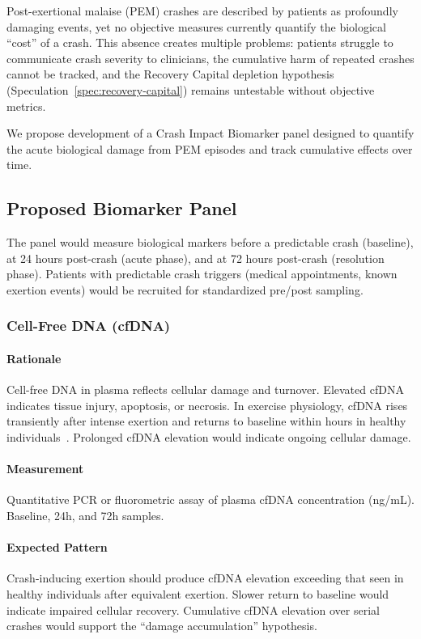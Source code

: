 Post-exertional malaise (PEM) crashes are described by patients as profoundly damaging events, yet no objective measures currently quantify the biological ``cost'' of a crash. This absence creates multiple problems: patients struggle to communicate crash severity to clinicians, the cumulative harm of repeated crashes cannot be tracked, and the Recovery Capital depletion hypothesis (Speculation~\ref{spec:recovery-capital}) remains untestable without objective metrics.

We propose development of a Crash Impact Biomarker panel designed to quantify the acute biological damage from PEM episodes and track cumulative effects over time.

\subsection{Proposed Biomarker Panel}

The panel would measure biological markers before a predictable crash (baseline), at 24 hours post-crash (acute phase), and at 72 hours post-crash (resolution phase). Patients with predictable crash triggers (medical appointments, known exertion events) would be recruited for standardized pre/post sampling.

\subsubsection{Cell-Free DNA (cfDNA)}

\paragraph{Rationale}
Cell-free DNA in plasma reflects cellular damage and turnover. Elevated cfDNA indicates tissue injury, apoptosis, or necrosis. In exercise physiology, cfDNA rises transiently after intense exertion and returns to baseline within hours in healthy individuals~\cite{Beiter2011cfDNA}. Prolonged cfDNA elevation would indicate ongoing cellular damage.

\paragraph{Measurement}
Quantitative PCR or fluorometric assay of plasma cfDNA concentration (ng/mL). Baseline, 24h, and 72h samples.

\paragraph{Expected Pattern}
Crash-inducing exertion should produce cfDNA elevation exceeding that seen in healthy individuals after equivalent exertion. Slower return to baseline would indicate impaired cellular recovery. Cumulative cfDNA elevation over serial crashes would support the ``damage accumulation'' hypothesis.

